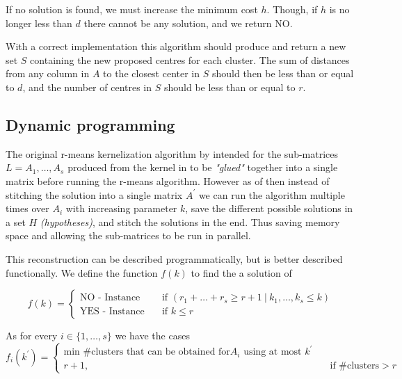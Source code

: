 \documentclass[a4paper]{article}
\begin{document}
If no solution is found, we must increase the minimum cost $h$. Though, if $h$ is no longer less than $d$ there cannot be any solution, and we return NO.



With a correct implementation this algorithm should produce and return a new set $S$ containing the new proposed
centres for each cluster. The sum of distances from any column in $A$ to the closest center in $S$ should then be
less than or equal to $d$, and the number of centres in $S$ should be less than or equal to $r$.

\subsection{Dynamic programming}
\label{sec:algo:dynamic-result}
The original r-means kernelization algorithm by \cite{fomin_golovach_panolan_2020}
intended for the sub-matrices $L=A_1,\dots,A_s$ produced from the kernel in  to be \textit{"glued"} together
into a single matrix before running the r-means algorithm. However as of  then instead of stitching the solution
into a single matrix $A^\prime$ we can run the algorithm multiple times over $A_i$ with increasing parameter $k$,
save the different possible solutions in a set $H$ \textit{(hypotheses)}, and stitch the solutions in the end. Thus saving
memory space and allowing the sub-matrices to be run in parallel.

This reconstruction can be described programmatically, but is better described functionally. We define the function $f(k)$ to find
the a solution of

\[ f(k) =
    \begin{cases}
        \text{NO - Instance}  & \quad \text{if } (r_1 + \hdots + r_s \geq r+1 ~|~ k_1, \hdots, k_s \leq k) \\
        \text{YES - Instance} & \quad \text{if } k \leq r
    \end{cases}
\]

As for every $i \in \{1,\dots,s\}$ we have the cases
\[ f_i(k^\prime) =
    \begin{cases}
        \text{min \#clusters that can be obtained for} A_i \text{ using at most } k^\prime &                                \\
        r+1,                                                                               & \quad \text{if \#clusters} > r
    \end{cases}
\]
\end{document}
